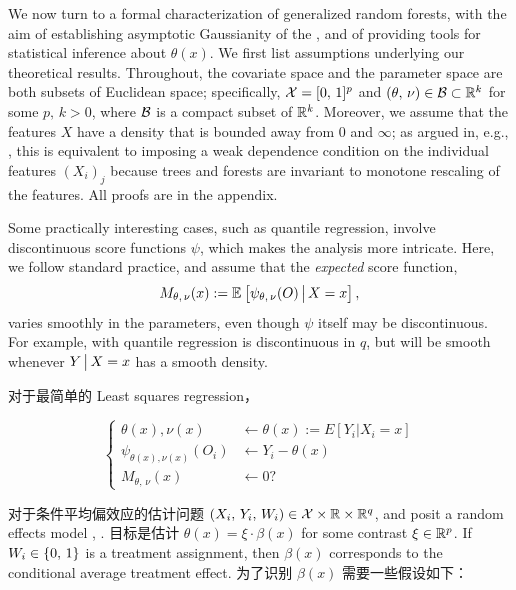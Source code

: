 \documentclass[aos]{imsart}
\theoremstyle{plain}
\theoremstyle{definition}
\theoremstyle{remark}
\begin{document}
\begin{CJK}{UTF8}{gbsn}
We now turn to a formal characterization of generalized random forests, with the aim of establishing asymptotic Gaussianity of the , and of providing tools for statistical inference about $\theta(x)$.
We first list assumptions underlying our theoretical results.
Throughout, the covariate space and the parameter space are both subsets of Euclidean space;
specifically, $\mathcal{X} = [0, \, 1]^p$ and $(\theta, \, \nu) \in \mathcal{B} \subset \mathbb{R}^k$
for some $p, \, k > 0$, where $\mathcal{B}$ is a compact subset of $\mathbb{R}^k$.
Moreover, we assume that the features $X$ have a density that is bounded away from 0 and $\infty$; as
argued in, e.g., \citet{wager2015uniform}, this is equivalent to imposing a weak dependence condition on the
individual features $(X_i)_j$ because trees and forests are invariant to monotone rescaling of the features.
All proofs are in the appendix.

Some practically interesting cases, such as quantile regression, involve discontinuous score functions $\psi$,
which makes the analysis more intricate. Here, we follow standard practice, and
assume that the \emph{expected} score function,
\begin{equation}
\label{eq:M}
M_{\theta, \, \nu}(x) := \EE{\psi_{\theta, \, \nu}(O) \cond X = x},
\end{equation}
varies smoothly in the parameters, even though $\psi$ itself may be
discontinuous. For example, with quantile regression
 is discontinuous in $q$,
but  will be smooth
whenever $Y\,\big|\, X = x$ has a smooth density.


对于最简单的 Least squares regression，


$$
\begin{cases}
\theta(x), \nu(x) &\leftarrow  \theta(x) := E[Y_i|X_i=x] \\
\psi_{\theta(x), \nu(x)}(O_i) &\leftarrow Y_i - \theta(x) \\
M_{\theta, \, \nu}(x)  &\leftarrow 0 ?
\end{cases}
$$

对于条件平均偏效应的估计问题 $(X_i, \, Y_i, \, W_i) \in \mathcal{X} \times \mathbb{R} \times \mathbb{R}^q$, and posit a random effects model , .
目标是估计 $\theta(x) = \xi \cdot \beta(x)$ for some contrast $\xi \in \mathbb{R}^p$. If $W_i \in \left\{0, \, 1\right\}$ is a treatment assignment, then $\beta(x)$ corresponds to the conditional average treatment effect. 为了识别 $\beta(x)$ 需要一些假设如下：


\end{CJK}
\end{document}
